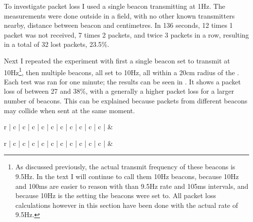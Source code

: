 To investigate packet loss I used a single beacon transmitting at 1Hz.
The measurements were done outside in a field, with no other known transmitters nearby, distance between beacon and  centimetres.
In 136 seconds, 12 times 1 packet was not received, 7 times 2 packets, and twice 3 packets in a row, resulting in a total of 32 lost packets, 23.5\%.

Next I repeated the experiment with first a single beacon set to transmit at 10Hz\footnote{As discussed previously, the actual transmit frequency of these beacons is 9.5Hz. In the text I will continue to call them 10Hz beacons, because 10Hz and 100ms are easier to reason with than 9.5Hz rate and 105ms intervals, and because 10Hz is the setting the beacons were set to. All packet loss calculations however in this section have been done with the actual rate of 9.5Hz.}, then multiple beacons, all set to 10Hz, all within a 20cm radius of the \device.
Each test was ran for one minute; the results can be seen in .
It shows a packet loss of between 27 and 38\%, with a generally a higher packet loss for a larger number of beacons.
This can be explained because packets from different beacons may collide when sent at the same moment.

\begin{table}
    \begin{tabular}{r | c | c | c | c | c | c | c | c | c | c |}
        &  \\
    \end{tabular}
    \caption{Expected chance that not all beacons have been observed at different listening intervals, with a random packet loss of 38\%}
    \label{tbl:rss-packet-loss}
\end{table}

\begin{table}
    \begin{tabular}{r | c | c | c | c | c | c | c | c | c | c |}
        &  \\
    \end{tabular}
    \caption{Measured chance that not all beacons have been observed at different listening intervals}
    \label{tbl:rss-packet-loss-empirical}
\end{table}

